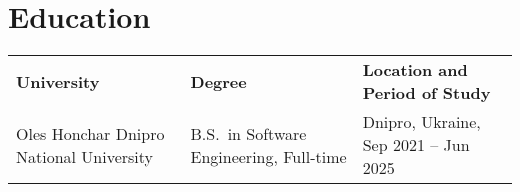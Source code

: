 \section{Education} \label{sec:education}
\begin{tabularx}{\textwidth}{XXX}
    \textbf{University} & \textbf{Degree} & \textbf{Location and Period of Study} \\
    Oles Honchar Dnipro National University & B.S.\ in Software Engineering, Full-time & Dnipro, Ukraine, Sep 2021 -- Jun 2025 \\
\end{tabularx}